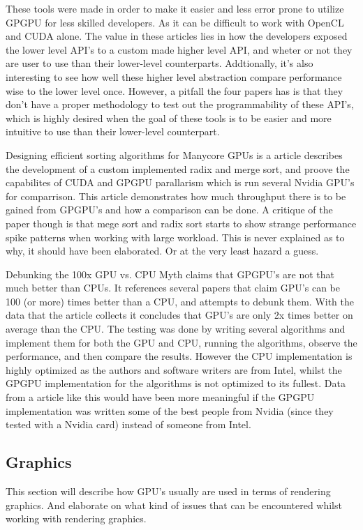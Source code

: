 These tools were made in order to make it easier and less error prone to utilize GP\gls{GPU} for less skilled developers. As it can be difficult to work with OpenCL and CUDA alone.
The value in these articles lies in how the developers exposed the lower level \gls{API}'s to a custom made higher level \gls{API}, and wheter or not they are user to use than their lower-level counterparts. Addtionally, it's also interesting to see how well these higher level abstraction compare performance wise to the lower level once. However, a pitfall the four papers has is that they don't have a proper methodology to test out the programmability of these \gls{API}'s, which is highly desired when the goal of these tools is to be easier and more intuitive to use than their lower-level counterpart.

Designing efficient sorting algorithms for Manycore GPUs \cite{satish_2009_designing} is a article describes the development of a custom implemented radix and merge sort, and proove the capabilites of CUDA and GPGPU parallarism which is run several Nvidia \gls{GPU}'s for comparrison. 
This article demonstrates how much throughput there is to be gained from GP\gls{GPU}'s and how a comparison can be done. 
A critique of the paper though is that mege sort and radix sort starts to show strange performance spike patterns when working with large workload. 
This is never explained as to why, it should have been elaborated.
Or at the very least hazard a guess.

Debunking the 100x \gls{GPU} vs. CPU Myth \cite{lee_2010_debunking} claims that GP\gls{GPU}'s are not that much better than CPUs. 
It references several papers that claim \gls{GPU}'s can be 100 (or more) times better than a CPU, and attempts to debunk them. 
With the data that the article collects it concludes that \gls{GPU}'s are only 2x times better on average than the CPU. 
The testing was done by writing several algorithms and implement them for both the \gls{GPU} and CPU, running the algorithms, observe the performance, and then compare the results. 
However the CPU implementation is highly optimized as the authors and software writers are from Intel, whilst the GP\gls{GPU} implementation for the algorithms is not optimized to its fullest. 
Data from a article like this would have been more meaningful if the GP\gls{GPU} implementation was written some of the best people from Nvidia (since they tested with a Nvidia card) instead of someone from Intel.

\subsection{Graphics}
This section will describe how \gls{GPU}'s usually are used in terms of rendering graphics. And elaborate on what kind of issues that can be encountered whilst working with rendering graphics.

